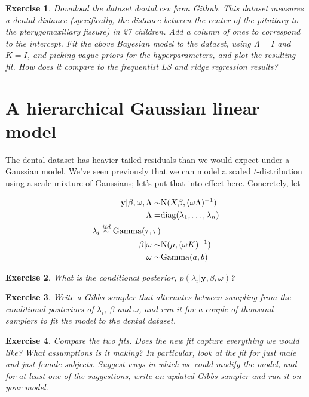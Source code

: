 \documentclass[twoside]{article}
\newcounter{lecnum}
\newtheorem{exercise}{Exercise}[lecnum]
\begin{document}
\begin{exercise}
  Download the dataset dental.csv from Github. This dataset measures a dental distance (specifically, the distance between the center of the pituitary to the pterygomaxillary fissure) in 27 children. Add a column of ones to correspond to the intercept. Fit the above Bayesian model to the dataset, using $\Lambda=I$ and $K=I$, and picking vague priors for the hyperparameters, and plot the resulting fit. How does it compare to the frequentist LS and ridge regression results?
\end{exercise}



\section{A hierarchical Gaussian linear model}
The dental dataset has heavier tailed residuals than we would expect under a Gaussian model. We've seen previously that we can model a scaled $t$-distribution using a scale mixture of Gaussians; let's put that into effect here. Concretely, let

$$\begin{aligned}
  \mathbf{y}|\beta,\omega,\Lambda \sim& \mbox{N}(X\beta, (\omega \Lambda)^{-1})\\
  \Lambda =& \mbox{diag}(\lambda_1,\dots, \lambda_n)\\
  \lambda_i \stackrel{\small{iid}}{\sim} \mbox{Gamma}(\tau,\tau)\\
  \beta|\omega \sim& \mbox{N}(\mu, (\omega K)^{-1})\\
  \omega \sim& \mbox{Gamma}(a,b)
\end{aligned}$$

\begin{exercise}
  What is the conditional posterior, $p(\lambda_i|\mathbf{y},\beta, \omega)$?
\end{exercise}

\begin{exercise}
  Write a Gibbs sampler that alternates between sampling from the conditional posteriors of $\lambda_i$, $\beta$ and $\omega$, and run it for a couple of thousand samplers to fit the model to the dental dataset. 
\end{exercise}

\begin{exercise}
  Compare the two fits. Does the new fit capture everything we would like? What assumptions is it making? In particular, look at the fit for just male and just female subjects. Suggest ways in which we could modify the model, and for at least one of the suggestions, write an updated Gibbs sampler and run it on your model.
\end{exercise}
  
  
\end{document}
